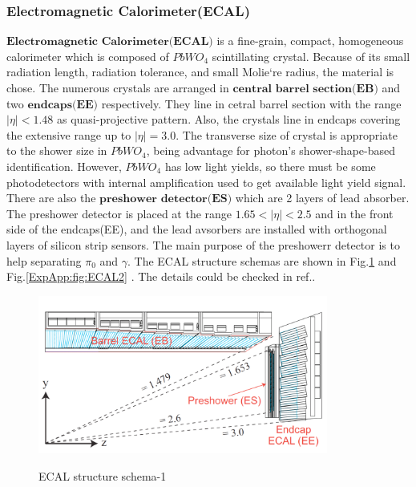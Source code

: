		\subsubsection{Electromagnetic Calorimeter(ECAL)}
		\label{sssec:ecal}

			$\textbf{Electromagnetic Calorimeter(ECAL)}$ is a fine-grain, compact, homogeneous calorimeter which is composed of $PbWO_4$ scintillating crystal. Because of its small radiation length, radiation tolerance, and small Molie`re radius, the material is chose. The numerous crystals are arranged in $\textbf{central}$ $\textbf{barrel}$ $\textbf{section}$$\textbf{(EB)}$ and two $\textbf{endcaps}$$\textbf{(EE)}$ respectively. They line in cetral barrel section with the range $|\eta|<1.48$ as quasi-projective pattern. Also, the crystals line in endcaps covering the extensive range up to $|\eta|=3.0$. The transverse size of crystal is appropriate to the shower size in $PbWO_4$, being advantage for photon's shower-shape-based identification. However, $PbWO_4$ has low light yields, so there must be some photodetectors with internal amplification used to get available light yield signal. There are also the $\textbf{preshower}$ $\textbf{detector}$$\textbf{(ES)}$ which are 2 layers of lead absorber. The preshower detector is placed at the range $1.65<|\eta|<2.5$ and in the front side of the endcaps(EE), and the lead avsorbers are installed with orthogonal layers of silicon strip sensors. The main purpose of the preshowerr detector is to help separating $\pi_0$ and $\gamma$. The ECAL structure schemas are shown in Fig.\ref{ExpApp:fig:ECAL1} and Fig.\ref{ExpApp:fig:ECAL2} . The details could be checked in ref.\cite{ECAL_ex}.


			\begin{figure}[H]
			\centering{}
		    	\includegraphics[width=0.85\textwidth]{Figures/ExpApparatus/ECAL.png}\\
			\caption{ECAL structure schema-1\cite{ECAL_ex}}
			\label{ExpApp:fig:ECAL1}
			\end{figure}
			\FloatBarrier

